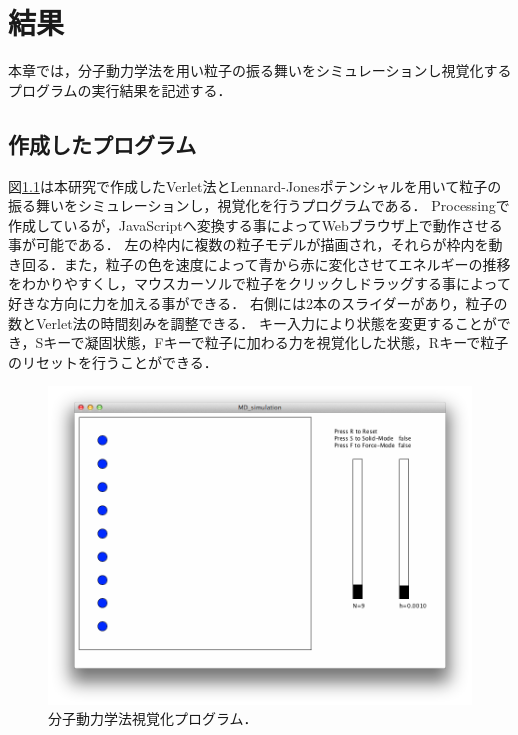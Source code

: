 \chapter{結果}
本章では，分子動力学法を用い粒子の振る舞いをシミュレーションし視覚化するプログラムの実行結果を記述する．

\section{作成したプログラム}
図\ref{fig:MDprogram}は本研究で作成したVerlet法とLennard-Jonesポテンシャルを用いて粒子の振る舞いをシミュレーションし，視覚化を行うプログラムである．
Processingで作成しているが，JavaScriptへ変換する事によってWebブラウザ上で動作させる事が可能である．
左の枠内に複数の粒子モデルが描画され，それらが枠内を動き回る．また，粒子の色を速度によって青から赤に変化させてエネルギーの推移をわかりやすくし，マウスカーソルで粒子をクリックしドラッグする事によって好きな方向に力を加える事ができる．
右側には2本のスライダーがあり，粒子の数とVerlet法の時間刻みを調整できる．
キー入力により状態を変更することができ，Sキーで凝固状態，Fキーで粒子に加わる力を視覚化した状態，Rキーで粒子のリセットを行うことができる．

\newpage
\begin{figure}[htbp]
 \begin{center}
  \includegraphics[width=150mm]{../implement/MDprogram.png}
 \end{center}
 \caption{分子動力学法視覚化プログラム．}
 \label{fig:MDprogram}
\end{figure}

\newpage


